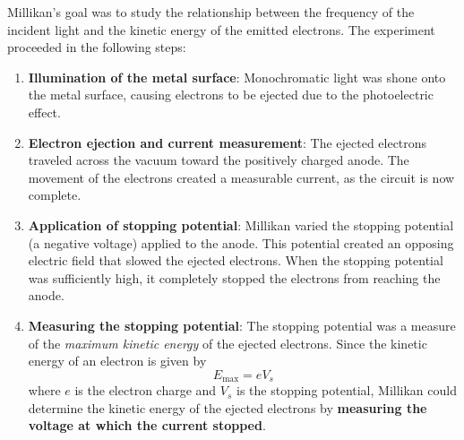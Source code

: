 \documentclass[a4paper,12pt]{article}
\begin{document}
Millikan's goal was to study the relationship between the frequency of the incident light and the kinetic energy of the emitted electrons. The experiment proceeded in the following steps:
\begin{enumerate}
  \item \textbf{Illumination of the metal surface}: Monochromatic light was shone onto the metal surface, causing electrons to be ejected due to the photoelectric effect.

  \item \textbf{Electron ejection and current measurement}: The ejected electrons traveled across the vacuum toward the positively charged anode. The movement of the electrons created a measurable current, as the circuit is now complete.

  \item \textbf{Application of stopping potential}: Millikan varied the stopping potential (a negative voltage) applied to the anode. This potential created an opposing electric field that slowed the ejected electrons. When the stopping potential was sufficiently high, it completely stopped the electrons from reaching the anode.

  \item \textbf{Measuring the stopping potential}: The stopping potential was a measure of the \textit{maximum kinetic energy} of the ejected electrons. Since the kinetic energy of an electron is given by
        \[
          E_{\max} = eV_s
        \]
        where \(e\) is the electron charge and \(V_s\) is the stopping potential, Millikan could determine the kinetic energy of the ejected electrons by \textbf{measuring the voltage at which the current stopped}.
\end{enumerate}
\end{document}
